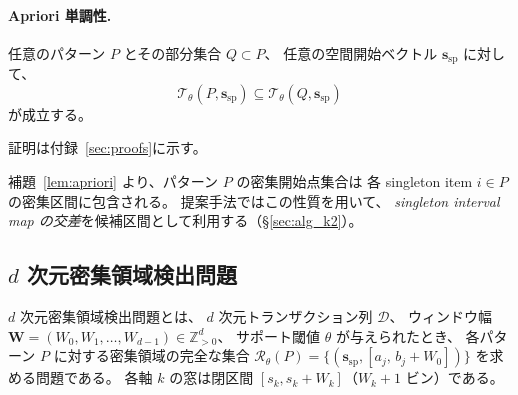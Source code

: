 \paragraph{Apriori 単調性.}

\begin{lemma}[密集開始点集合の単調性]\label{lem:apriori}
任意のパターン $P$ とその部分集合 $Q \subset P$、
任意の空間開始ベクトル $\bm{s}_{\mathrm{sp}}$ に対して、
\[
  \mathcal{T}_\theta(P,\bm{s}_{\mathrm{sp}})
  \subseteq
  \mathcal{T}_\theta(Q,\bm{s}_{\mathrm{sp}})
\]
が成立する。
\end{lemma}

証明は付録~\ref{sec:proofs}に示す。

補題~\ref{lem:apriori} より、パターン $P$ の密集開始点集合は
各 singleton item $i \in P$ の密集区間に包含される。
提案手法ではこの性質を用いて、
\emph{singleton interval map の交差}を候補区間として利用する（\S\ref{sec:alg_k2}）。

\subsection{$d$ 次元密集領域検出問題}\label{sec:dense_detection}

$d$ 次元密集領域検出問題とは、
$d$ 次元トランザクション列 $\mathcal{D}$、
ウィンドウ幅
$\bm{W} = (W_0, W_1, \ldots, W_{d-1}) \in \mathbb{Z}_{>0}^d$、
サポート閾値 $\theta$ が与えられたとき、
各パターン $P$ に対する密集領域の完全な集合
$\mathcal{R}_\theta(P)
= \{(\bm{s}_{\mathrm{sp}}, [a_j,\, b_j + W_0])\}$
を求める問題である。
各軸 $k$ の窓は閉区間 $[s_k, s_k + W_k]$（$W_k + 1$ ビン）である。
